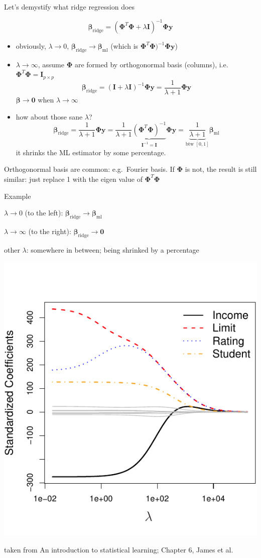 \documentclass[ignorenonframetext,aspectratio=169]{beamer}
\providecommand{\tightlist}{%
  \setlength{\itemsep}{0pt}\setlength{\parskip}{0pt}}
\newcommand{\vv}[1]{\boldsymbol{#1}}
\begin{document}
\begin{frame}{Let's demystify what ridge regression does}
\protect\hypertarget{lets-demystify-what-ridge-regression-does}{}

\[\vv{\beta}_{\text{ridge}} = (\vv{\Phi}^T\vv{\Phi} + \lambda\vv{I})^{-1}\vv{\Phi}\vv{y}\]

\begin{itemize}
\tightlist
\item
  obviously, \(\lambda \rightarrow 0\),
  \(\vv{\beta}_{\text{ridge}} \rightarrow \vv{\beta}_{\text{ml}}\)
  (which is \(\vv{\Phi}^T\vv{\Phi})^{-1}\vv{\Phi}\vv{y}\))
\item
  \(\lambda \rightarrow \infty\), assume \(\vv{\Phi}\) are formed by
  orthogonormal basis (columns), i.e.
  \(\vv{\Phi}^T\vv{\Phi}=\vv{I}_{p\times p}\)
  \[\vv{\beta}_{\text{ridge}} = (\vv{I}+\lambda\vv{I})^{-1} \vv{\Phi y} = \frac{1}{\lambda+1} \vv{\Phi y}\]
  \(\vv{\beta} \rightarrow \vv{0}\) when \(\lambda \rightarrow \infty\)
\item
  how about those sane \(\lambda\)?
  \[\vv{\beta}_{\text{ridge}} =\frac{1}{\lambda+1}\vv{\Phi}\vv{y}= \frac{1}{\lambda+1}\underbrace{(\vv{\Phi}^T\vv{\Phi})^{-1}}_{ \vv{I}^{-1}=\vv{I}}\vv{\Phi}\vv{y}= \underbrace{\frac{1}{\lambda+1}}_{\text{btw }[0, 1]} \vv{\beta}_{\text{ml}} \]
  it shrinks the ML estimator by some percentage.
\end{itemize}

\footnotesize Orthogonormal basis are common: e.g.~Fourier basis. If
\(\vv{\Phi}\) is not, the result is still similar: just replace 1 with
the eigen value of \(\vv{\Phi}^T\vv{\Phi}\)

\end{frame}

\begin{frame}{Example}
\protect\hypertarget{example}{}

\(\lambda \rightarrow 0\) (to the left):
\(\vv{\beta}_{\text{ridge}} \rightarrow \vv{\beta}_{\text{ml}}\)

\(\lambda \rightarrow \infty\) (to the right):
\(\vv{\beta}_{\text{ridge}} \rightarrow \vv{0}\)

other \(\lambda\): somewhere in between; being shrinked by a percentage
\vspace{-0.5cm}

\begin{center}\includegraphics[width=0.38\linewidth]{./figs/lec10_ridge} \end{center}

\footnotesize taken from An introduction to statistical learning;
Chapter 6, James et al.

\end{frame}
\end{document}
